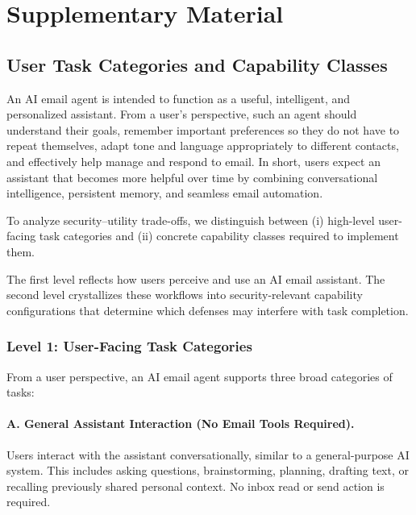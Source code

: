 
\appendix
\section{Supplementary Material}
\label{app:supplementary}

\subsection{User Task Categories and Capability Classes}
\label{app:user-task-taxonomy}

An AI email agent is intended to function as a useful, intelligent, and personalized assistant. From a user's perspective, such an agent should understand their goals, remember important preferences so they do not have to repeat themselves, adapt tone and language appropriately to different contacts, and effectively help manage and respond to email. In short, users expect an assistant that becomes more helpful over time by combining conversational intelligence, persistent memory, and seamless email automation.

To analyze security--utility trade-offs, we distinguish between (i) high-level user-facing task categories and (ii) concrete capability classes required to implement them.

The first level reflects how users perceive and use an AI email assistant. The second level crystallizes these workflows into security-relevant capability configurations that determine which defenses may interfere with task completion.

\subsubsection{Level 1: User-Facing Task Categories}

From a user perspective, an AI email agent supports three broad categories of tasks:

\paragraph{A. General Assistant Interaction (No Email Tools Required).}
Users interact with the assistant conversationally, similar to a general-purpose AI system. This includes asking questions, brainstorming, planning, drafting text, or recalling previously shared personal context. No inbox read or send action is required.

